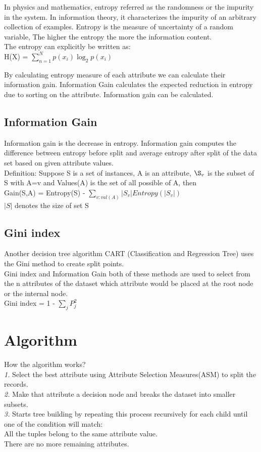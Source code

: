 \documentclass[conference,compsoc]{IEEEtran}
\begin{document}
In physics and mathematics, entropy referred as the randomness or the impurity in the system. In information theory, it characterizes the impurity of an arbitrary collection of examples.
Entropy is the measure of uncertainty of a random variable, The higher the entropy the more the information content.
\\ The entropy can explicitly be written as:
\\ H(X) = $\sum_{n=1}^{N}p(x_i)\log_{2}p(x_i)$

   
By calculating entropy measure of each attribute we can calculate their information gain. Information Gain calculates the expected reduction in entropy due to sorting on the attribute. Information gain can be calculated. 

\subsection{Information Gain}

Information gain is the decrease in entropy. Information gain computes the difference between entropy before split and average entropy after split of the data set based on given attribute values.
\\ Definition: Suppose S is a set of instances, A is an attribute, $\S_v$ is the subset of S with A=v and Values(A) is the set of all possible of A, then \\ Gain(S,A) = Entropy(S) - $\sum_{v:val(A)} |S_v| Entropy(|S_v|)$
\\ $|S|$ denotes the size of set S


\subsection{Gini index}

Another decision tree algorithm CART (Classification and Regression Tree) uses the Gini method to create split points.
\\ Gini index and Information Gain both of these methods are used to select from the n attributes of the dataset which attribute would be placed at the root node or the internal node.
\\ Gini index = 1 - $\sum_{j} P_j^2$


\section{Algorithm }
How the algorithm works?\\
\textit{1.} Select the best attribute using Attribute Selection Measures(ASM) to split the records.
\\\textit{2.} Make that attribute a decision node and breaks the dataset into smaller subsets.
\\\textit{3.} Starts tree building by repeating this process recursively for each child until one of the condition will match:
\\ \textendash All the tuples belong to the same attribute value.
\\\textendash There are no more remaining attributes.
\end{document}
